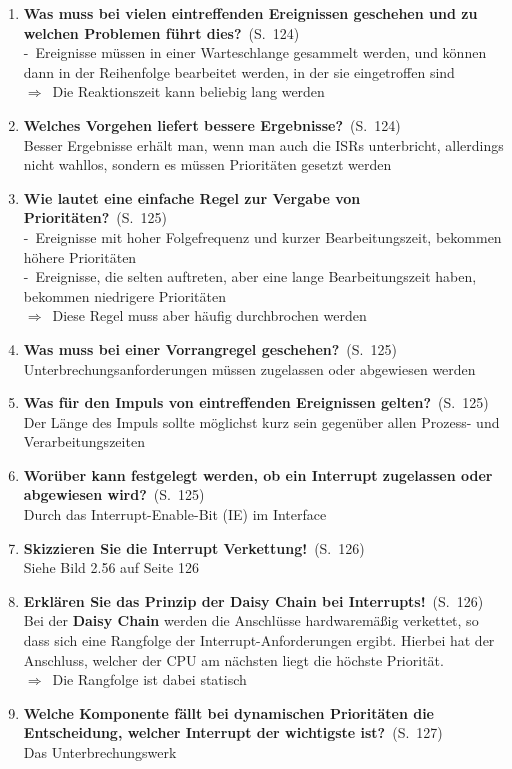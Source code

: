 \documentclass[a4paper,12pt]{article}
\newcommand{\question}[3]{\pagebreak[3]\item {\textbf{#1?}}\ (S.\ #2)#3}
\newcommand{\statement}[3]{\pagebreak[3]\item {\textbf{#1!}}\ (S.\ #2)#3}
\newcommand{\catchword}[1]{\\-\ #1}
\newcommand{\normaltext}[1]{\\#1}
\newcommand{\result}[1]{\\$\Rightarrow$\ #1}
\newcommand{\page}[1]{#1}
\newcommand{\important}[1]{\textbf{#1}}
\begin{document}
\begin{enumerate}
  \question{Was muss bei vielen eintreffenden Ereignissen geschehen und zu welchen
            Problemen führt dies}{\page{124}}
  {
    \catchword{Ereignisse müssen in einer Warteschlange gesammelt werden, und können
               dann in der Reihenfolge bearbeitet werden, in der sie eingetroffen
               sind}
    \result{Die Reaktionszeit kann beliebig lang werden}
  }

  \question{Welches Vorgehen liefert bessere Ergebnisse}{\page{124}}
  {
    \normaltext{Besser Ergebnisse erhält man, wenn man auch die ISRs unterbricht,
                allerdings nicht wahllos, sondern es müssen Prioritäten gesetzt werden}
  }

  \question{Wie lautet eine einfache Regel zur Vergabe von Prioritäten}{\page{125}}
  {
    \catchword{Ereignisse mit hoher Folgefrequenz und kurzer Bearbeitungszeit, bekommen
               höhere Prioritäten}
    \catchword{Ereignisse, die selten auftreten, aber eine lange Bearbeitungszeit haben,
               bekommen niedrigere Prioritäten}
    \result{Diese Regel muss aber häufig durchbrochen werden}
  }

  \question{Was muss bei einer Vorrangregel geschehen}{\page{125}}
  {
    \normaltext{Unterbrechungsanforderungen müssen zugelassen oder abgewiesen werden}
  }

  \question{Was für den Impuls von eintreffenden Ereignissen gelten}{\page{125}}
  {
    \normaltext{Der Länge des Impuls sollte möglichst kurz sein gegenüber allen
                Prozess- und Verarbeitungszeiten}
  }

  \question{Worüber kann festgelegt werden, ob ein Interrupt zugelassen
            oder abgewiesen wird}{\page{125}}
  {
    \normaltext{Durch das Interrupt-Enable-Bit (IE) im Interface}
  }

  \statement{Skizzieren Sie die Interrupt Verkettung}{\page{126}}
  {
    \normaltext{Siehe Bild 2.56 auf Seite 126}
  }

  \statement{Erklären Sie das Prinzip der Daisy Chain bei Interrupts}{\page{126}}
  {
    \normaltext{Bei der \important{Daisy Chain} werden die Anschlüsse hardwaremäßig
                verkettet, so dass sich eine Rangfolge der Interrupt-Anforderungen
                ergibt. Hierbei hat der Anschluss, welcher der CPU am nächsten liegt
                die höchste Priorität.}
    \result{Die Rangfolge ist dabei statisch}
  }

  \question{Welche Komponente fällt bei dynamischen Prioritäten die Entscheidung,
            welcher Interrupt der wichtigste ist}{\page{127}}
  {
    \normaltext{Das Unterbrechungswerk}
  }


\end{enumerate}
\end{document}

